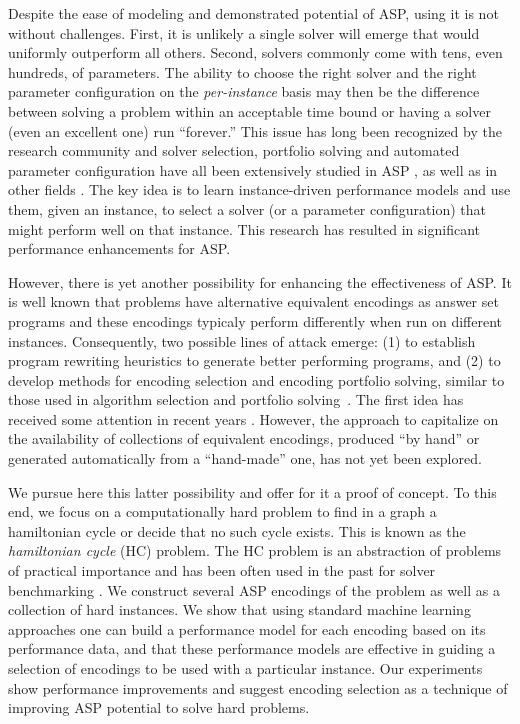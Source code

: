 \documentclass{new_tlp}
\begin{document}
Despite the ease of modeling and demonstrated potential of ASP, using it is 
not without challenges. First, it is unlikely a single solver will emerge
that would uniformly outperform all others. Second, solvers commonly come
with tens, even hundreds, of parameters. The ability to choose the right 
solver and the right parameter configuration on the \emph{per-instance} 
basis may then be the difference between solving a problem within an acceptable 
time bound or having a solver (even an excellent one) run ``forever.'' This 
issue has long been recognized by the research community and solver selection, 
portfolio solving and automated parameter configuration have all been 
extensively studied in ASP \cite{MarateaPR14,HoosLS14}, as well as 
in other fields \cite{Rice76,KerschkeHNT19}. The key idea is to learn
instance-driven performance models and use them, given an instance, to
select a solver (or a parameter configuration) that might perform well
on that instance. 
This research has resulted in significant performance enhancements for ASP. 

However, there is yet another possibility for enhancing the effectiveness 
of ASP. It is well known that problems have alternative equivalent encodings 
as answer set programs and these encodings typicaly perform differently when 
run on different instances. Consequently, two possible lines of attack emerge: 
(1) to establish program rewriting heuristics to generate better performing 
programs, and (2) to develop methods for encoding selection and encoding 
portfolio solving, similar to those used in algorithm selection and 
portfolio solving~\cite{GomesS01,HoosLS14}. The first idea has received some 
attention in recent years \cite{BuddenhagenL15,BichlerMW16,HippenL19}. 
However, the approach to capitalize on the availability of collections of 
equivalent encodings, produced ``by hand'' or generated automatically from 
a ``hand-made'' one, has not yet been explored.

We pursue here this latter possibility and offer for it a proof of concept.
To this end, we focus on a computationally hard problem to find in a graph
a hamiltonian cycle or decide that no such cycle exists. This is known
as the \emph{hamiltonian cycle} (HC) problem. The HC problem is an abstraction 
of problems of practical importance and has been often used in the past for 
solver benchmarking \cite{1staspcomp,2ndaspcomp}. We construct several ASP encodings of 
the problem as well as a collection of hard instances. We show that using 
standard machine learning approaches one can build a performance model for
each encoding based on its performance data, and that these performance models 
are effective in guiding a selection of encodings to be used with a particular 
instance. Our experiments show performance improvements and suggest encoding 
selection as a technique of improving ASP potential to solve hard problems.
\end{document}
